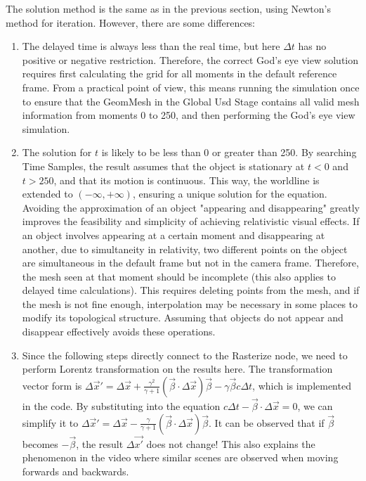 \documentclass{article}
\begin{document}
The solution method is the same as in the previous section, using Newton’s method for iteration. However, there are some differences:
\begin{enumerate}[(1)]
    \item The delayed time is always less than the real time, but here $\Delta t$ has no positive or negative restriction. Therefore, the correct God’s eye view solution requires first calculating the grid for all moments in the default reference frame. From a practical point of view, this means running the simulation once to ensure that the GeomMesh in the Global Usd Stage contains all valid mesh information from moments 0 to 250, and then performing the God’s eye view simulation.
    \item The solution for $t$ is likely to be less than 0 or greater than 250. By searching Time Samples, the result assumes that the object is stationary at $t < 0$ and $t > 250$, and that its motion is continuous. This way, the worldline is extended to $(-\infty, +\infty)$, ensuring a unique solution for the equation. Avoiding the approximation of an object "appearing and disappearing" greatly improves the feasibility and simplicity of achieving relativistic visual effects. If an object involves appearing at a certain moment and disappearing at another, due to simultaneity in relativity, two different points on the object are simultaneous in the default frame but not in the camera frame. Therefore, the mesh seen at that moment should be incomplete (this also applies to delayed time calculations). This requires deleting points from the mesh, and if the mesh is not fine enough, interpolation may be necessary in some places to modify its topological structure. Assuming that objects do not appear and disappear effectively avoids these operations.
    \item Since the following steps directly connect to the Rasterize node, we need to perform Lorentz transformation on the results here. The transformation vector form is $\Delta \vec{x}' = \Delta \vec{x} + \frac{\gamma^2}{\gamma + 1} (\vec{\beta} \cdot \Delta \vec{x}) \vec{\beta} - \gamma \vec{\beta} c \Delta t$, which is implemented in the code. By substituting into the equation $c \Delta t - \vec{\beta} \cdot \Delta \vec{x} = 0$, we can simplify it to $\Delta \vec{x}' = \Delta \vec{x} - \frac{\gamma}{\gamma + 1} (\vec{\beta} \cdot \Delta \vec{x}) \vec{\beta}$. It can be observed that if $\vec{\beta}$ becomes $-\vec{\beta}$, the result $\Delta \vec{x'}$ does not change! This also explains the phenomenon in the video where similar scenes are observed when moving forwards and backwards.
\end{enumerate}
\end{document}
